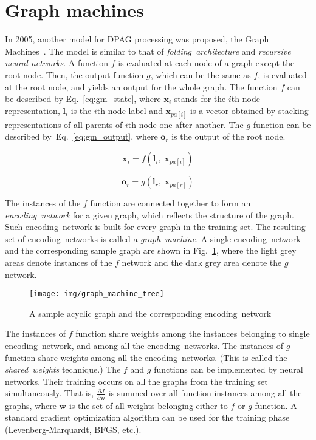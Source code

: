 \section{Graph machines}
In 2005, another model for DPAG processing was proposed, the Graph Machines~\cite{goulon2005learning}. The model is similar to that of \emph{folding~architecture} and \emph{recursive neural networks}. A function $f$ is evaluated at each node of a graph except the root node. Then, the output function $g$, which can be the same as $f$, is evaluated at the root node, and yields an output for the whole graph. The function $f$ can be described by Eq.~\ref{eq:gm_state}, where $\bm{x}_i$ stands for the $i$th node representation, $\bm{l}_i$ is the $i$th node label and $\bm{x}_{pa[i]}$ is a vector obtained by stacking representations of all parents of $i$th node one after another. The $g$ function can be described by~Eq.~\ref{eq:gm_output}, where $\bm{o}_r$ is the output of the root node.

\begin{equation}
\bm{x}_i = f(\bm{l}_i, \; \bm{x}_{pa[i]})
\label{eq:gm_state}
\end{equation}

\begin{equation}
\bm{o}_r = g(\bm{l}_r, \; \bm{x}_{pa[r]})
\label{eq:gm_output}
\end{equation}

The instances of the $f$ function are connected together to form an \emph{encoding~network} for a given graph, which reflects the structure of the graph. Such encoding~network is built for every graph in the training set. The resulting set of encoding~networks is called a \emph{graph~machine}. A single encoding~network and the corresponding sample graph are shown in Fig.~\ref{fig:graph_machine_tree}, where the light grey areas denote instances of the $f$ network and the dark grey area denote the $g$ network.

\begin{figure}[h!]
\begin{center}
	\texttt{[image: img/graph\_machine\_tree]}
	\caption{A sample acyclic graph and the corresponding encoding~network}
	\label{fig:graph_machine_tree}
\end{center}
\end{figure}

The instances of $f$ function share weights among the instances belonging to single encoding~network, and among all the encoding~networks. The instances of $g$ function share weights among all the encoding~networks. (This is called the \emph{shared~weights} technique.) The $f$ and $g$ functions can be implemented by neural networks. Their training occurs on all the graphs from the training set simultaneously. That is, $\frac{\partial J}{\partial \bm{w}}$ is summed over all function instances among all the graphs, where $\bm{w}$ is the set of all weights belonging either to $f$ or $g$ function. A standard gradient optimization algorithm can be used for the training phase (Levenberg-Marquardt, BFGS, etc.).

